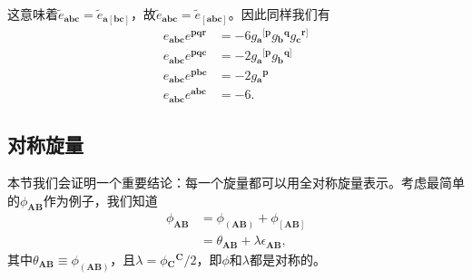 这意味着$\tilde{e}_{\boldsymbol{abc}} =\tilde{e}_{\boldsymbol{a}[\boldsymbol{bc}]}$，故$\tilde{e}_{\boldsymbol{abc}} =\tilde{e}_{[\boldsymbol{abc}]}$。因此同样我们有
\begin{equation*}
	\begin{aligned}
		e_{\boldsymbol{abc}} e^{\boldsymbol{pqr}} & =-6g{_{\boldsymbol{a}}}^{[\boldsymbol{p}} g{_{\boldsymbol{b}}}^{\boldsymbol{q}} g{_{\boldsymbol{c}}}^{\boldsymbol{r}]}\\
		e_{\boldsymbol{abc}} e^{\boldsymbol{pqc}} & =-2g{_{\boldsymbol{a}}}^{[\boldsymbol{p}} g{_{\boldsymbol{b}}}^{\boldsymbol{q}]}\\
		e_{\boldsymbol{abc}} e^{\boldsymbol{pbc}} & =-2g{_{\boldsymbol{a}}}^{\boldsymbol{p}}\\
		e_{\boldsymbol{abc}} e^{\boldsymbol{abc}} & =-6.
	\end{aligned}
\end{equation*}

\subsection{对称旋量}

本节我们会证明一个重要结论：每一个旋量都可以用全对称旋量表示。考虑最简单的$\phi _{\boldsymbol{AB}}$作为例子，我们知道
\begin{equation*}
	\begin{aligned}
		\phi _{\boldsymbol{AB}} & =\phi _{(\boldsymbol{AB})} +\phi _{[\boldsymbol{AB}]}\\
		& =\theta _{\boldsymbol{AB}} +\lambda \epsilon _{\boldsymbol{AB}} ,
	\end{aligned}
\end{equation*}
其中$\theta _{\boldsymbol{AB}} \equiv \phi _{(\boldsymbol{AB})}$，且$\lambda =\phi {_{\boldsymbol{C}}}^{\boldsymbol{C}} /2$，即$\phi $和$\lambda $都是对称的。



